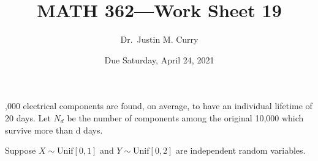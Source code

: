 \documentclass[addpoints,12pt]{exam}
\title{\vspace{-1in} MATH 362---Work Sheet 19}
\date{Due Saturday, April 24, 2021}
\author{Dr.~Justin M. Curry}
\begin{document}
\maketitle






\begin{questions}


,000 electrical components are found, on average, to have an individual lifetime of 20 days. Let $N_d$ be the number of components among the original 10,000 which survive more than d days.

\noaddpoints
{}
\addpoints

\question[5] Suppose $X\sim \text{Unif}[0,1]$ and $Y\sim \text{Unif}[0,2]$ are independent random variables.

 \noaddpoints
{}
\end{questions}
\end{document}
